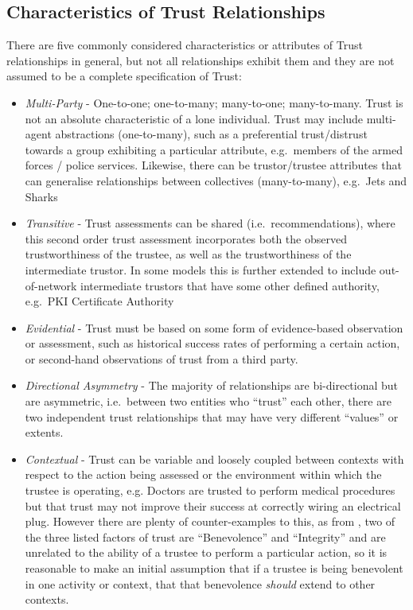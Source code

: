 \subsection{Characteristics of Trust Relationships}

There are five commonly considered characteristics or attributes of Trust relationships in general, but not all relationships exhibit them and they are not assumed to be a complete specification of Trust:

\begin{itemize}
  \item \emph{Multi-Party} - One-to-one; one-to-many; many-to-one; many-to-many.
    Trust is not an absolute characteristic of a lone individual.
    Trust may include multi-agent abstractions (one-to-many), such as a preferential trust/distrust towards a group exhibiting a particular attribute, e.g.\ members of the armed forces / police services.
    Likewise, there can be trustor/trustee attributes that can generalise relationships between collectives (many-to-many), e.g.\ Jets and Sharks
  \item \emph{Transitive} - Trust assessments can be shared (i.e.\ recommendations), where this second order trust assessment incorporates both the observed trustworthiness of the trustee, as well as the trustworthiness of the intermediate trustor.
    In some models this is further extended to include out-of-network intermediate trustors that have some other defined authority, e.g.\ PKI Certificate Authority
  \item \emph{Evidential} - Trust must be based on some form of evidence-based observation or assessment, such as historical success rates of performing a certain action, or second-hand observations of trust from a third party.
  \item \emph{Directional Asymmetry} - The majority of relationships are bi-directional but are asymmetric, i.e.\ between two entities who ``trust'' each other, there are two independent trust relationships that may have very different ``values'' or extents.
  \item \emph{Contextual} - Trust can be variable and loosely coupled between contexts with respect to the action being assessed or the environment within which the trustee is operating, e.g.
    Doctors are trusted to perform medical procedures but that trust may not improve their success at correctly wiring an electrical plug.
    However there are plenty of counter-examples to this, as from \cite{Mayer1995}, two of the three listed factors of trust are ``Benevolence'' and ``Integrity'' and are unrelated to the ability of a trustee to perform a particular action, so it is reasonable to make an initial assumption that if a trustee is being benevolent in one activity or context, that that benevolence \emph{should} extend to other contexts.

\end{itemize}
